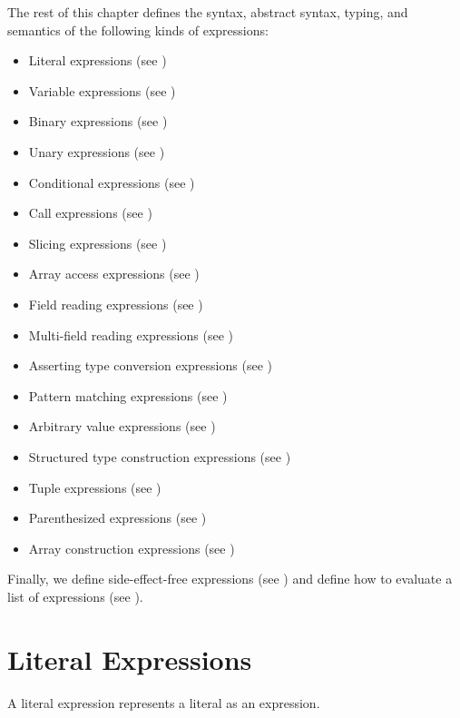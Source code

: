 The rest of this chapter defines the syntax, abstract syntax, typing,
and semantics of the following kinds of expressions:
\begin{itemize}
  \item Literal expressions (see )
  \item Variable expressions (see )
  \item Binary expressions (see )
  \item Unary expressions (see )
  \item Conditional expressions (see )
  \item Call expressions (see )
  \item Slicing expressions (see )
  \item Array access expressions (see )
  \item Field reading expressions (see )
  \item Multi-field reading expressions (see )
  \item Asserting type conversion expressions (see )
  \item Pattern matching expressions (see )
  \item Arbitrary value expressions (see )
  \item Structured type construction expressions (see )
  \item Tuple expressions (see )
  \item Parenthesized expressions (see )
  \item Array construction expressions (see )
\end{itemize}

Finally, we define side-effect-free expressions (see )
and define how to evaluate a list of expressions (see ).

\hypertarget{def-literalexpressionterm}{}
\section{Literal Expressions\label{sec:LiteralExpressions}}
A literal expression represents a literal as an expression.

